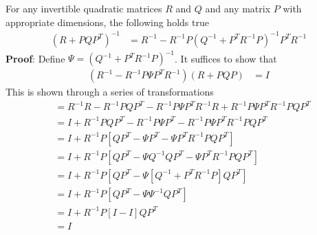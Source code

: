 \newpage
\begin{theo} \label{theorem:woodbury}
For any invertible quadratic matrices $R$ and $Q$ and any matrix $P$ with appropriate dimensions, the following holds true
\begin{align*}
(R + P Q P^{T} )^{-1} &= R^{-1} - R^{-1} P (Q^{-1} + P^{T} R^{-1} P)^{-1} P^{T} R^{-1}
\end{align*}
\noindent \textbf{Proof}: Define $\Psi = (Q^{-1} + P^{T} R^{-1} P )^{-1}$. It suffices to show that
\begin{align*}
(R^{-1} - R^{-1} P \Psi P^{T} R^{-1})(R + P Q P) &= I 
\end{align*}
This is shown through a series of transformations
\begin{align*}
&= R^{-1} R - R^{-1} P Q P^{T} - R^{-1} P \Psi P^{T} R^{-1} R + R^{-1} P \Psi P^{T} R^{-1} P Q P^{T}  \\ 
&= I + R^{-1} P Q P^{T} - R^{-1} P \Psi P^{T} - R^{-1} P \Psi P^{T} R^{-1} P Q P^{T}  \\
&= I + R^{-1} P \left[ Q P^{T} - \Psi P^{T} - \Psi P^{T} R^{-1} P Q P^{T} \right]  \\
&= I + R^{-1} P \left[ Q P^{T} - \Psi Q^{-1} Q P^{T} - \Psi P^{T} R^{-1} P Q P^{T} \right]  \\
&= I + R^{-1} P \left[ Q P^{T} - \Psi \left[ Q^{-1} + P^{T} R^{-1} P \right] Q P^{T} \right]  \\
&= I + R^{-1} P \left[ Q P^{T} - \Psi \Psi^{-1} Q P^{T} \right] \\
&= I + R^{-1} P \left[ I - I \right] Q P^{T}  \\
&= I \nonumber
\end{align*}
\end{theo}